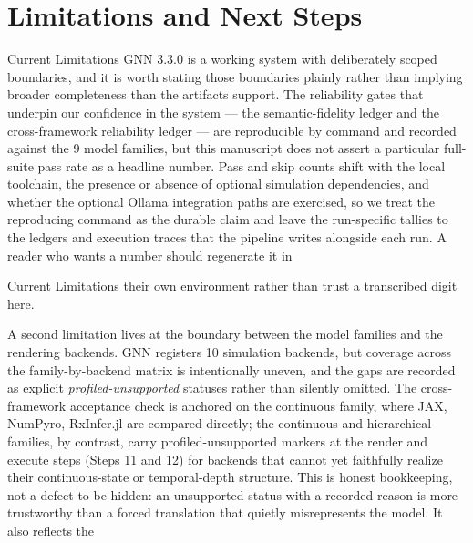 \documentclass[
  ignorenonframetext,
]{beamer}
\author{\texorpdfstring{}{}}
\date{}
\begin{document}
\section{Limitations and Next Steps}\label{sec:limitations_next_steps}

\begin{frame}{Current Limitations}
\protect{}\label{current-limitations}
GNN 3.3.0 is a working system with deliberately scoped boundaries, and
it is worth stating those boundaries plainly rather than implying
broader completeness than the artifacts support. The reliability gates
that underpin our confidence in the system --- the semantic-fidelity
ledger and the cross-framework reliability ledger --- are reproducible
by command and recorded against the 9 model families, but this
manuscript does not assert a particular full-suite pass rate as a
headline number. Pass and skip counts shift with the local toolchain,
the presence or absence of optional simulation dependencies, and whether
the optional Ollama integration paths are exercised, so we treat the
reproducing command as the durable claim and leave the run-specific
tallies to the ledgers and execution traces that the pipeline writes
alongside each run. A reader who wants a number should regenerate it in
\end{frame}

\begin{frame}{Current Limitations}
their own environment rather than trust a transcribed digit here.

A second limitation lives at the boundary between the model families and
the rendering backends. GNN registers 10 simulation backends, but
coverage across the family-by-backend matrix is intentionally uneven,
and the gaps are recorded as explicit \emph{profiled-unsupported}
statuses rather than silently omitted. The cross-framework acceptance
check is anchored on the continuous family, where JAX, NumPyro,
RxInfer.jl are compared directly; the continuous and hierarchical
families, by contrast, carry profiled-unsupported markers at the render
and execute steps (Steps 11 and 12) for backends that cannot yet
faithfully realize their continuous-state or temporal-depth structure.
This is honest bookkeeping, not a defect to be hidden: an unsupported
status with a recorded reason is more trustworthy than a forced
translation that quietly misrepresents the model. It also reflects the
\end{frame}
\end{document}
